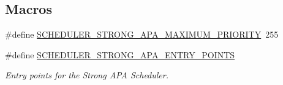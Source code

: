 \subsection*{Macros}
\begin{DoxyCompactItemize}
\item 
\#define \hyperlink{group__RTEMSScoreSchedulerStrongAPA_gab917bac4c45882604043daa2f4fafcfb}{S\+C\+H\+E\+D\+U\+L\+E\+R\+\_\+\+S\+T\+R\+O\+N\+G\+\_\+\+A\+P\+A\+\_\+\+M\+A\+X\+I\+M\+U\+M\+\_\+\+P\+R\+I\+O\+R\+I\+TY}~255
\item 
\#define \hyperlink{group__RTEMSScoreSchedulerStrongAPA_ga98b37281082c0be47dc489eed554c5cc}{S\+C\+H\+E\+D\+U\+L\+E\+R\+\_\+\+S\+T\+R\+O\+N\+G\+\_\+\+A\+P\+A\+\_\+\+E\+N\+T\+R\+Y\+\_\+\+P\+O\+I\+N\+TS}
\begin{DoxyCompactList}\small\item\em Entry points for the Strong A\+PA Scheduler. \end{DoxyCompactList}\end{DoxyCompactItemize}
